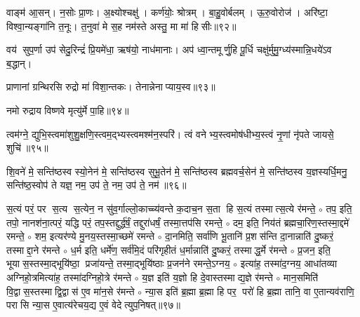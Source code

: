 वाङ्म॑ आ॒सन्। 
न॒सोः प्रा॒णः। 
अ॒क्ष्योश्चक्षु॑। 
कर्ण॑योः॒ श्रोत्रम्। 
बा॒हु॒वोर्बलम्। 
ऊ॒रु॒वोरोज॑। 
अरि॑ष्टा॒ विश्वा॒न्यङ्गा॑नि त॒नूः। 
त॒नुवा॑ मे स॒ह नम॑स्ते अस्तु॒ मा मा॑ हिसीः॥९२॥\anuvakamend

वय॑ सुप॒र्णा उप॑ सेदु॒रिन्द्रं॑ प्रि॒यमे॑धा॒ ऋष॑यो॒ नाध॑मानाः। 
अप॑ ध्वा॒न्तमूर्णु॒हि पू॒र्धि चक्षु॑र्मुमु॒ग्ध्य॑स्मान्नि॒धये॑ऽव ब॒द्धान्।\anuvakamend

प्राणानां ग्रन्थिरसि रुद्रो मा॑ विशा॒न्तकः। 
तेनान्नेनाप्या\-य॒स्व॥९३॥\anuvakamend

नमो रुद्राय विष्णवे मृत्यु॑र्मे पा॒हि॥९४॥\anuvakamend


त्वम॑ग्ने॒ द्युभि॒स्त्वमा॑शुशु॒क्षणि॒स्त्वम॒द्भ्यस्त्वमश्म॑न॒स्परि॑। 
त्वं वनेभ्य॒स्त्वमोष॑धीभ्य॒स्त्वं नृ॒णां नृ॑पते जायसे॒ शुचि॑॥९५॥\anuvakamend

शि॒वने॑ मे॒ सन्ति॑ष्ठस्व स्यो॒नेन॑  मे॒ सन्ति॑ष्ठस्व सुभू॒तेन॑  मे॒ सन्ति॑ष्ठस्व ब्रह्मवर्च॒सेन॑  मे॒ सन्ति॑ष्ठस्व य॒ज्ञस्यर्धि॒मनु॒ सन्ति॑ष्ठ॒स्वोप॑ ते यज्ञ॒ नम॒ उप॑ ते॒ नम॒ उप॑ ते॒ नम॑॥९६॥\anuvakamend

\newcommand{\sep}{{\small$\circ$} }
स॒त्यं परं॒ पर स॒त्य स॒त्येन॒ न सु॑व॒र्गाल्लो॒काच्च्य॑वन्ते क॒दाच॒न स॒ता हि स॒त्यं तस्मात्स॒त्ये र॑मन्ते॒ \sep
तप॒ इति॒ तपो॒ नानश॑ना॒त्परं॒ यद्धि परं॒ तप॒स्तद्दुर्द्ध॑र्\mbox{}षं॒ तद्दुरा॑धर्\mbox{}षं॒ तस्मा॒त्तप॑सि रमन्ते॒ \sep
दम॒ इति॒ निय॑तं ब्रह्मचा॒रिण॒स्तस्मा॒द्दमे॑ रमन्ते॒ \sep
शम॒ इत्यर॑ण्ये मु॒नय॒स्तस्मा॒च्छमे॑ रमन्ते \sep
दा॒नमिति॒ सर्वा॑णि भू॒तानि॑ प्र॒शस॑न्ति दा॒नान्नाति॑ दु॒ष्करं॒ तस्माद्दा॒ने र॑मन्ते \sep
ध॒र्म इति॒ धर्मे॑ण॒ सर्व॑मि॒दं परि॑गृहीतं ध॒र्मान्नाति॑ दु॒ष्करं॒ तस्माद्ध॒र्मे र॑मन्ते \sep
प्र॒जन॒ इति॒ भूयास॒स्तस्मा॒द्भूयि॑ष्ठा॒ प्रजा॑यन्ते॒ तस्मा॒द्भूयि॑ष्ठाः प्र॒जन॑ने रमन्ते॒ऽग्नय॒ \sep
इत्या॑ह॒ तस्मा॑द॒ग्नय॒ आधा॑तव्या अग्निहो॒त्रमित्या॑ह॒ तस्मा॑दग्निहो॒त्रे र॑मन्ते \sep
य॒ज्ञ इति॑ य॒ज्ञो हि दे॒वास्तस्माद्य॒ज्ञे र॑मन्ते \sep
मान॒समिति॑ वि॒द्वास॒स्तस्माद्वि॒द्वास॑ ए॒व मा॑न॒से र॑मन्ते \sep
न्या॒स इति॑ ब्र॒ह्मा ब्र॒ह्मा हि पर॒ परो॑ हि ब्र॒ह्मा तानि॒ वा ए॒तान्यव॑राणि॒ परासि न्या॒स ए॒वात्य॑रेचय॒द्य ए॒वं वेदेत्युप॒निषत्॥९७॥
\anuvakamend


